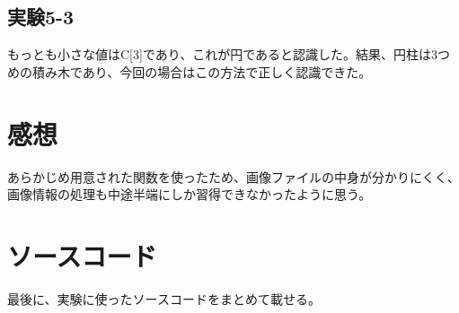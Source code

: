 \documentclass{jarticle}[2012/05/15]
\begin{document}
\subsection{実験5-3}
もっとも小さな値はC[3]であり、これが円であると認識した。結果、円柱は3つめの積み木であり、今回の場合はこの方法で正しく認識できた。
\section{感想}
あらかじめ用意された関数を使ったため、画像ファイルの中身が分かりにくく、画像情報の処理も中途半端にしか習得できなかったように思う。\par
\pagebreak
\section{ソースコード}
最後に、実験に使ったソースコードをまとめて載せる。\par
{\scriptsize
 　　
}
\pagebreak
{\scriptsize
 　　
}
\pagebreak
{\scriptsize
 　　
}
\pagebreak
{\scriptsize
 　　
}
\pagebreak
{\scriptsize
 　　
}
\pagebreak
{\scriptsize
 　　
}
\pagebreak
{\scriptsize
 　　
}
\pagebreak
{\scriptsize
 　　
}
\pagebreak
\end{document}
